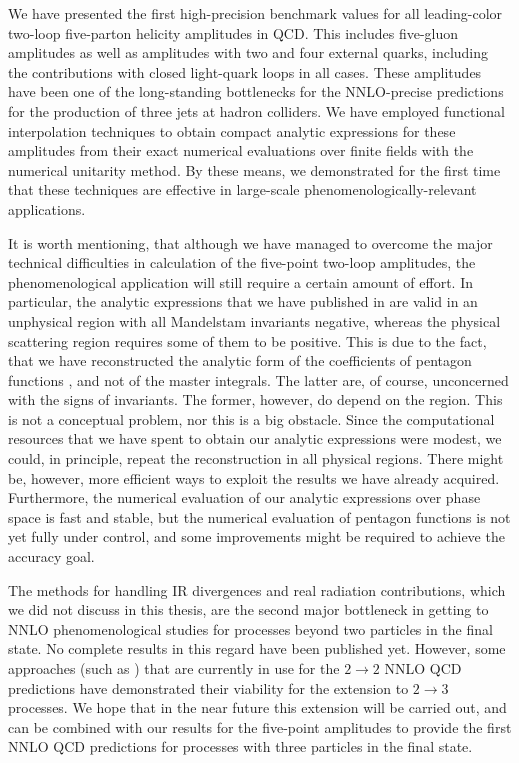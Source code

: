 We have presented the first high-precision benchmark values \cite{Abreu:2018jgq} 
for all leading-color two-loop five-parton helicity amplitudes in QCD. This includes
five-gluon amplitudes as well as amplitudes with two and four
external quarks, including the contributions with closed light-quark loops in all cases.
These amplitudes have been one of the long-standing bottlenecks for the NNLO-precise predictions for the production of three jets at hadron colliders.
We have employed functional interpolation techniques to obtain \cite{Abreu:2019odu} compact analytic expressions for these amplitudes
from their exact numerical evaluations over finite fields with the numerical unitarity method.
By these means, we demonstrated for the first time that these techniques are effective in large-scale phenomenologically-relevant applications.

It is worth mentioning,
that although we have managed to overcome the major technical difficulties in calculation of the five-point two-loop amplitudes,
the phenomenological application will still require a certain amount of effort. In particular,
the analytic expressions that we have published in \cite{Abreu:2019odu} are valid in an unphysical region with all Mandelstam invariants negative, whereas
the physical scattering region requires some of them to be positive.
This is due to the fact, that we have reconstructed the analytic form of the coefficients of pentagon functions \cite{Gehrmann:2018yef}, and not of the master integrals.
The latter are, of course, unconcerned with the signs of invariants.
The former, however, do depend on the region.
This is not a conceptual problem, nor this is a big obstacle.
Since the computational resources that we have spent to obtain our analytic expressions were modest, we
could, in principle, repeat the reconstruction in all physical regions.
There might be, however, more efficient ways to exploit the results we have already acquired.
Furthermore, the numerical evaluation of our analytic expressions over phase space is fast and stable,
but the numerical evaluation of pentagon functions is not yet fully under control, and some improvements might be required to 
achieve the accuracy goal. 

The methods for handling IR divergences and real radiation contributions, which we did not discuss in this thesis,
are the second major bottleneck in getting to NNLO phenomenological studies for processes beyond
two particles in the final state. No complete results in this regard have been published yet.
However, some approaches (such as \cite{GehrmannDeRidder:2005cm,Czakon:2010td,Currie:2013vh}) that are currently in use for the $2\to 2$
NNLO QCD predictions have demonstrated their viability for the extension to $2\to 3$ processes.
We hope that in the near future this extension will be carried out, and can be combined with our results for the five-point amplitudes
to provide the first NNLO QCD predictions for processes with three particles in the final state.

